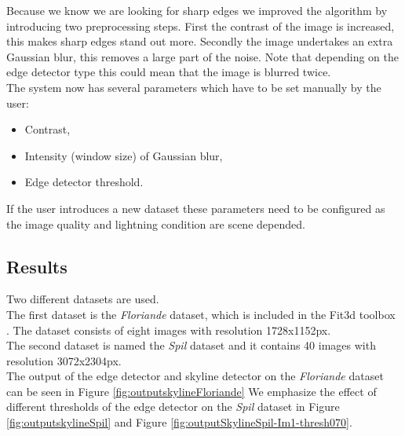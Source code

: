 Because we know we are looking for sharp edges we improved the algorithm by
introducing two preprocessing steps. First the contrast of the image is
increased, this makes sharp edges stand out more.  Secondly the image undertakes
an extra Gaussian blur, this removes a large part of the noise. Note that
depending on the edge detector type this could mean that the image is blurred
twice.\\

The system now has several parameters which have to be set manually by the user:
\begin{itemize}
	\item Contrast,
	\item Intensity (window size) of Gaussian blur,
	\item Edge detector threshold.
\end{itemize}

If the user introduces a new dataset these parameters need to be configured
as the image quality and lightning condition are scene depended.


\subsection{Results}
Two different datasets are used. \\
The first dataset is the \emph{Floriande} dataset, which is included in the
Fit3d toolbox \cite{Fit3d}.  The dataset consists of eight images with resolution 1728x1152px.\\
The second dataset is named the \emph{Spil} dataset and it contains 40 images
with resolution 3072x2304px.\\

The output of the edge detector and skyline detector on the \emph{Floriande}
dataset \cite{Fit3d} can be seen in Figure \ref{fig:outputskylineFloriande}
We emphasize the effect of different thresholds of the edge detector on the
\emph{Spil} dataset in Figure \ref{fig:outputskylineSpil} and Figure
\ref{fig:outputSkylineSpil-Im1-thresh070}.

\pagebreak
{}


